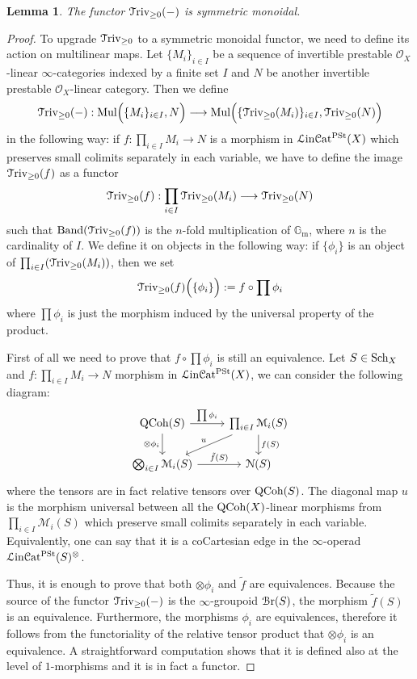 \documentclass[11pt, twoside]{article} %
\numberwithin{equation}{section}
\theoremstyle{plain}
\newtheorem{lem}[thm]{Lemma}
\theoremstyle{definition}
\newcommand{\Gm}{\mathbb G_{\mathrm{m}}}
\newcommand{\QCoh}{\textup{QCoh}}
\newcommand{\Triv}{\mathcal{T}\textup{riv}}
\newcommand{\cO}{{\mathcal O}}
\newcommand{\cM}{\mathcal M}
\newcommand{\Sch}{\textup{Sch}}
\newcommand{\cBr}{\mathcal{B}\textup{r}}
\newcommand{\Linpre}{{\mathcal L\textup{in}\mathcal{C}\textup{at}^{\textup{PSt}}}}
\begin{document}
 
 \begin{lem}\label{symm-mon}
	    The functor $\Triv_{\geq 0}(-)$ is symmetric monoidal.
	\end{lem}	
 \begin{proof}
	To upgrade $\Triv_{\geq 0}$ to a symmetric monoidal functor, we need to define its action on multilinear maps. Let $\{ M_i \}_{i \in I}$ be a sequence of invertible prestable $\cO_X$-linear $\infty$-categories indexed by a finite set $I$ and $N$ be another invertible prestable $\cO_X$-linear category. Then we define 
	$$ \Triv_{\geq 0}(-): \textup{Mul}\Big(\{ M_i\}_{i \in I}, N\Big) \longrightarrow \textup{Mul}\Big(\{ \Triv_{\geq 0}(M_i)\}_{i \in I}, \Triv_{\geq 0}(N) \Big)$$
	in the following way: if $f:\prod_{i \in I} M_i \rightarrow N$ is a morphism in $\Linpre(X)$ which preserves small colimits separately in each variable, we have to define the image $\Triv_{\geq 0}(f)$ as a functor 
	$$\Triv_{\geq 0}(f): \prod_{i \in I} \Triv_{\geq 0}(M_i) \longrightarrow \Triv_{\geq 0}(N)$$ 
	such that $\textup{Band}(\Triv_{\geq 0}(f))$ is the $n$-fold multiplication of $\Gm$, where $n$ is the cardinality of $I$. We define it on objects in the following way: if $\{ \phi_i \}$ is an object of $\prod_{i \in I}(\Triv_{\geq 0}(M_i))$, then we set 
	$$\Triv_{\geq 0}(f) \Big(\{ \phi_i \} \Big) := f \circ \prod \phi_i$$
	where $\prod \phi_i$ is just the morphism induced by the universal property of the product. 
	
	First of all we need to prove that $f \circ \prod \phi_i$ is still an equivalence. Let $S \in \Sch_X$ and $f: \prod_{i\in I}M_i \rightarrow N$ morphism in $\Linpre(X)$, we can consider the following diagram:
	\begin{equation}\label{diagram}
	\begin{tikzcd}
\QCoh(S)  \arrow[r, "\prod \phi_i"] \arrow[d, "\otimes \phi_i"'] & \prod_{i \in I} \cM_i(S) \arrow[ld,"u"'] \arrow[d, "f(S)"] \\
\bigotimes_{i\in I} \cM_i(S) \arrow[r, "\tilde{f}(S)"]                   & \mathcal{N}(S)
\end{tikzcd}
\end{equation}
where the tensors are in fact relative tensors over $\QCoh(S)$. The diagonal map $u$ is the morphism universal between all the $\QCoh(X)$-linear morphisms from $\prod_{i \in I} \cM_i(S)$ which preserve small colimits separately in each variable. Equivalently, one can say that it is a coCartesian edge in the $\infty$-operad $\Linpre(S)^{\otimes}$.

Thus, it is enough to prove that both $\otimes \phi_i$ and $\tilde{f}$ are equivalences. Because the source of the functor $\Triv_{\geq 0}(-)$ is the $\infty$-groupoid $\cBr(S)$, the morphism $\tilde{f}(S)$ is an equivalence. Furthermore, the morphisms $\phi_i$ are equivalences, therefore it follows from the functoriality of the relative tensor product that $\otimes \phi_i$ is an equivalence. A straightforward computation shows that it is defined also at the level of $1$-morphisms and it is in fact a functor.


\end{proof}
\end{document}
